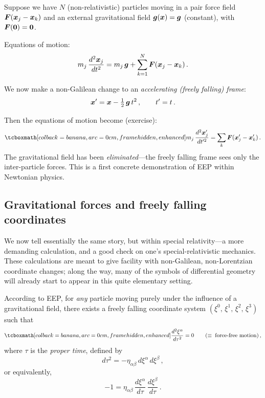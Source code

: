 Suppose we have $N$ (non-relativistic) particles moving in a pair
force field $\boldsymbol{F}(\boldsymbol{x}_j - \boldsymbol{x}_k)$ and an external gravitational
field $\boldsymbol{g}(\boldsymbol{x}) = \boldsymbol{g}$ (constant), with $\boldsymbol{F}(\boldsymbol{0}) = \boldsymbol{0}$.

\noindent Equations of motion:
\begin{equation}\label{eq:eom-N-particles}
  m_j\,\frac{d^2\boldsymbol{x}_j}{dt^2}
    = m_j\,\boldsymbol{g}
      + \sum_{k=1}^{N} \boldsymbol{F}(\boldsymbol{x}_j - \boldsymbol{x}_k)\,.
\end{equation}

We now make a non-Galilean change to an \emph{accelerating
(freely falling) frame}:
\begin{equation}\label{eq:accelerating-frame}
  \boldsymbol{x}' = \boldsymbol{x} - \tfrac{1}{2}\,\boldsymbol{g}\,t^2\,,\qquad
  t' = t\,.
\end{equation}

Then the equations of motion become (exercise):
\begin{equation}\label{eq:eom-freefall}
  \eqbox{m_j\,\frac{d^2\vb{x}'_j}{dt'^2}
    = \sum_{k} \vb{F}(\vb{x}'_j - \vb{x}'_k)}\,.
\end{equation}
The gravitational field has been \emph{eliminated}---the freely falling
frame sees only the inter-particle forces.  This is a first concrete
demonstration of EEP within Newtonian physics.

\subsection{Gravitational forces and freely falling coordinates}

We now tell essentially the same story, but within special
relativity---a more demanding calculation, and a good check on
one's special-relativistic mechanics.  These calculations are meant
to give facility with non-Galilean, non-Lorentzian coordinate
changes; along the way, many of the symbols of differential geometry
will already start to appear in this quite elementary setting.

According to EEP, for \emph{any} particle moving purely under the
influence of a gravitational field, there exists a freely falling
coordinate system $(\xi^0,\,\xi^1,\,\xi^2,\,\xi^3)$ such that
\begin{equation}\label{eq:force-free}
  \eqbox{\frac{d^2\xi^\alpha}{d\tau^2} = 0}
  \qquad (\equiv\;\text{force-free motion})\,,
\end{equation}
where $\tau$ is the \emph{proper time}, defined by
\begin{equation}\label{eq:proper-time-flat}
  d\tau^2 = -\eta_{\alpha\beta}\,d\xi^\alpha\,d\xi^\beta\,,
\end{equation}
or equivalently,
\begin{equation}\label{eq:4vel-normalisation}
  -1 = \eta_{\alpha\beta}\,
    \frac{d\xi^\alpha}{d\tau}\,\frac{d\xi^\beta}{d\tau}\,.
\end{equation}


